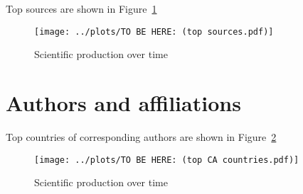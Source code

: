 \documentclass[a4paper,10pt]{article}
\begin{document}
Top sources are shown in Figure~\ref{fig:sources-scatter}

\begin{figure}
	\centering
	\texttt{[image: ../plots/TO BE HERE: (top sources.pdf)]}
	\caption{Scientific production over time}
	\label{fig:sources-scatter}
\end{figure}


\section{Authors and affiliations}


Top countries of corresponding authors are shown in Figure~\ref{fig:ca-countries-scatter}

\begin{figure}
	\centering
	\texttt{[image: ../plots/TO BE HERE: (top CA countries.pdf)]}
	\caption{Scientific production over time}
	\label{fig:ca-countries-scatter}
\end{figure}
\end{document}
